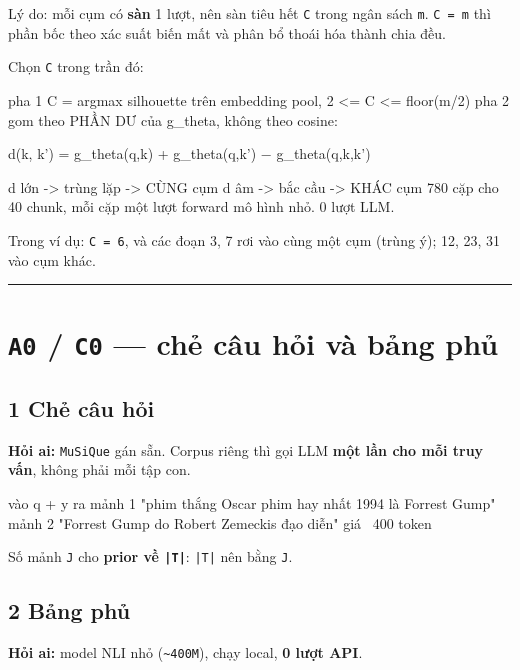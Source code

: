 \documentclass[11pt,a4paper]{article}
\begin{document}
Lý do: mỗi cụm có \textbf{sàn} 1 lượt, nên sàn tiêu hết \texttt{C} trong ngân sách \texttt{m}. \texttt{C = m} thì phần
bốc theo xác suất biến mất và phân bổ thoái hóa thành chia đều.

Chọn \texttt{C} trong trần đó:

\begin{dia}
pha 1    C  =  argmax silhouette trên embedding pool,   2 <= C <= floor(m/2)
pha 2    gom theo PHẦN DƯ của g_theta, không theo cosine:

             d(k, k')  =  g_theta(q,{k}) + g_theta(q,{k'}) − g_theta(q,{k,k'})

             d lớn  ->  trùng lặp  ->  CÙNG cụm
             d âm   ->  bắc cầu    ->  KHÁC cụm
         780 cặp cho 40 chunk, mỗi cặp một lượt forward mô hình nhỏ. 0 lượt LLM.
\end{dia}

Trong ví dụ: \texttt{C = 6}, và các đoạn 3, 7 rơi vào cùng một cụm (trùng ý); 12, 23, 31 vào cụm
khác.

\vspace{0.3em}\hrule\vspace{0.6em}

\section{\texttt{A0} / \texttt{C0} — chẻ câu hỏi và bảng phủ}

\subsection{1 Chẻ câu hỏi}

\textbf{Hỏi ai:} \texttt{MuSiQue} gán sẵn. Corpus riêng thì gọi LLM \textbf{một lần cho mỗi truy vấn}, không
phải mỗi tập con.

\begin{dia}
vào    q + y
ra     mảnh 1   "phim thắng Oscar phim hay nhất 1994 là Forrest Gump"
       mảnh 2   "Forrest Gump do Robert Zemeckis đạo diễn"
giá    ~400 token
\end{dia}

Số mảnh \texttt{J} cho \textbf{prior về \texttt{|T|}}: \texttt{|T|} nên bằng \texttt{J}.

\subsection{2 Bảng phủ}

\textbf{Hỏi ai:} model NLI nhỏ (\texttt{\textasciitilde{}400M}), chạy local, \textbf{0 lượt API}.
\end{document}
